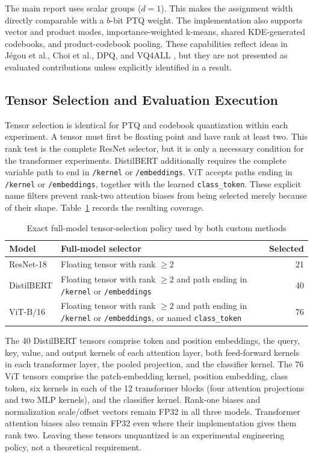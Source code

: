 \documentclass[conference]{IEEEtran}
\begin{document}
The main report uses scalar groups ($d=1$). This makes the assignment width directly comparable with a $b$-bit PTQ weight. The implementation also supports vector and product modes, importance-weighted k-means, shared KDE-generated codebooks, and product-codebook pooling. These capabilities reflect ideas in J\'egou et al., Choi et al., DPQ, and VQ4ALL \cite{jegou2011,choi2017,shao2024,deng2024}, but they are not presented as evaluated contributions unless explicitly identified in a result.

\subsection{Tensor Selection and Evaluation Execution}

Tensor selection is identical for PTQ and codebook quantization within each experiment. A tensor must first be floating point and have rank at least two. This rank test is the complete ResNet selector, but it is only a necessary condition for the transformer experiments. DistilBERT additionally requires the complete variable path to end in \texttt{/kernel} or \texttt{/embeddings}. ViT accepts paths ending in \texttt{/kernel} or \texttt{/embeddings}, together with the learned \texttt{class\_token}. These explicit name filters prevent rank-two attention biases from being selected merely because of their shape. Table~\ref{tab:tensor-selection} records the resulting coverage.

\begin{table}[t]
\caption{Exact full-model tensor-selection policy used by both custom methods}
\label{tab:tensor-selection}
\centering
\small
\begin{tabular}{@{}p{}p{}r@{}}
\toprule
Model & Full-model selector & Selected \tabularnewline
\midrule
ResNet-18 & Floating tensor with rank $\geq 2$ & 21 \tabularnewline
DistilBERT & Floating tensor with rank $\geq 2$ and path ending in \texttt{/kernel} or \texttt{/embeddings} & 40 \tabularnewline
ViT-B/16 & Floating tensor with rank $\geq 2$ and path ending in \texttt{/kernel} or \texttt{/embeddings}, or named \texttt{class\_token} & 76 \tabularnewline
\bottomrule
\end{tabular}
\end{table}

The 40 DistilBERT tensors comprise token and position embeddings, the query, key, value, and output kernels of each attention layer, both feed-forward kernels in each transformer layer, the pooled projection, and the classifier kernel. The 76 ViT tensors comprise the patch-embedding kernel, position embedding, class token, six kernels in each of the 12 transformer blocks (four attention projections and two MLP kernels), and the classifier kernel. Rank-one biases and normalization scale/offset vectors remain FP32 in all three models. Transformer attention biases also remain FP32 even where their implementation gives them rank two. Leaving these tensors unquantized is an experimental engineering policy, not a theoretical requirement.
\end{document}
